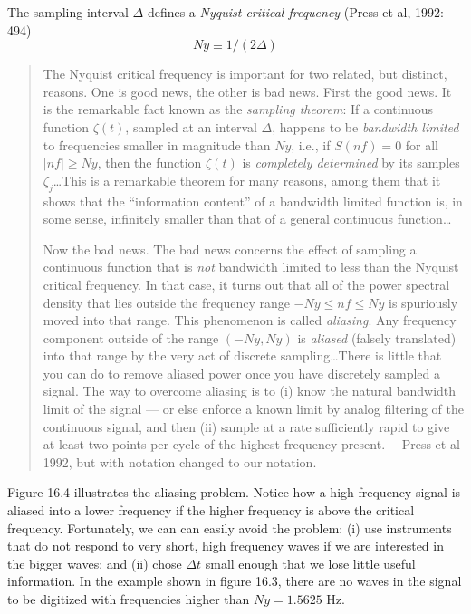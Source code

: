 The sampling interval $\Delta $ defines a \textit{Nyquist critical frequency} (Press et al, 1992:
494)
\begin{equation}
Ny \equiv 1/( 2 \Delta )
\end{equation}
\begin{quotation} \small
The Nyquist critical frequency is important for two related, but distinct,
reasons. One is good news, the other is bad news. First the good news. It is
the remarkable fact known as the \textit{sampling theorem}: If a continuous
function $\zeta(t)$, sampled at an interval $\Delta $, happens to be
\textit{bandwidth limited} to frequencies smaller in magnitude than $Ny$, i.e.,
if $S(nf)=0$ for all $|nf| \geq Ny$, then the function $\zeta(t)$ is
\textit{completely determined} by its samples $\zeta _j$\dots This is a
remarkable theorem for many reasons, among them that it shows that the
``information content'' of a bandwidth limited function is, in some sense,
infinitely smaller than that of a general continuous function\dots

Now the bad news. The bad news concerns the effect of sampling a continuous
function that is \textit{not} bandwidth limited to less than the Nyquist
critical frequency. In that case, it turns out that all of the power spectral
density that lies outside the frequency range $-Ny \le nf \le Ny$ is spuriously
moved into that range. This phenomenon is called \textit{aliasing}. Any
frequency component outside of the range $(-Ny, Ny)$ is \textit{aliased} (falsely
translated) into that range by the very act of discrete sampling\dots There is
little that you can do to remove aliased power once you have discretely sampled
a signal. The way to overcome aliasing is to (i) know the natural bandwidth
limit of the signal --- or else enforce a known limit by analog filtering of
the continuous signal, and then (ii) sample at a rate sufficiently rapid to
give at least two points per cycle of the highest frequency present. ---Press
et al 1992, but with notation changed to our notation.
\end{quotation}

Figure 16.4 illustrates the aliasing problem. Notice how a high frequency
signal is aliased into a lower frequency if the higher frequency is above the
critical frequency. Fortunately, we can can easily avoid the
problem: (i) use instruments that do not respond to very short,
high frequency waves if we are interested in the bigger waves; and (ii) chose
$\Delta t$ small enough that we lose little useful information. In the example
shown in figure 16.3, there are no waves in the signal to be digitized with
frequencies higher than $Ny = 1.5625$ Hz.

